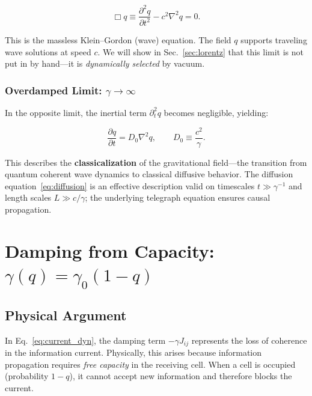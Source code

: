 \documentclass[aps,prd,twocolumn,showpacs,superscriptaddress,preprintnumbers]{revtex4-2}
\begin{document}
\begin{equation}
\boxed{\Box q \equiv \frac{\partial^2 q}{\partial t^2} - c^2 \nabla^2 q = 0}.
\label{eq:kg}
\end{equation}

This is the massless Klein--Gordon (wave) equation.
The field $q$ supports traveling wave solutions at speed $c$.
We will show in Sec.~\ref{sec:lorentz} that this limit is not put in by hand---it is \emph{dynamically selected} by vacuum.

\subsubsection{Overdamped Limit: $\gamma\to\infty$}

In the opposite limit, the inertial term $\partial_t^2 q$ becomes negligible, yielding:

\begin{equation}
\boxed{\frac{\partial q}{\partial t} = D_0 \nabla^2 q, \qquad D_0 \equiv \frac{c^2}{\gamma}}.
\label{eq:diffusion}
\end{equation}

This describes the \textbf{classicalization} of the gravitational field---the transition from quantum coherent wave dynamics to classical diffusive behavior.
The diffusion equation~\eqref{eq:diffusion} is an effective description valid on timescales $t\gg\gamma^{-1}$ and length scales $L\gg c/\gamma$; the underlying telegraph equation ensures causal propagation.

\section{Damping from Capacity: $\gamma(q)=\gamma_0(1-q)$}
\label{sec:gamma}

\subsection{Physical Argument}

In Eq.~\eqref{eq:current_dyn}, the damping term $-\gamma J_{ij}$ represents the loss of coherence in the information current.
Physically, this arises because information propagation requires \emph{free capacity} in the receiving cell.
When a cell is occupied (probability $1-q$), it cannot accept new information and therefore blocks the current.
\end{document}
